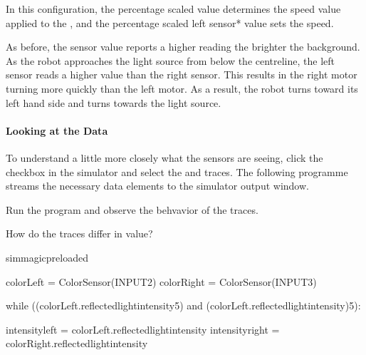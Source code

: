\documentclass[letterpaper,10pt,english]{sphinxmanual}
\begin{document}
{\begin{sphinxVerbatim}[commandchars=\\\{\}]
 
\end{sphinxVerbatim}

In this configuration, the percentage scaled  value determines the speed value applied to the , and the percentage scaled left sensor* value sets the  speed.

As before, the sensor value reports a higher reading the brighter the background. As the robot approaches the light source from below the centreline, the left sensor reads a higher value than the right sensor. This results in the right motor turning more quickly than the left motor. As a result, the robot turns toward its left hand side and turns towards the light source.


\paragraph{Looking at the Data}
\label{\detokenize{content/03_Robot_Lab/Section_00_03:Looking-at-the-Data}}
To understand a little more closely what the sensors are seeing, click the  checkbox in the simulator and select the  and  traces. The following programme streams the necessary data elements to the simulator output window.

Run the program and observe the behvavior of the traces.

How do the traces differ in value?

{
\begin{sphinxVerbatim}[commandchars=\\\{\}]
\llap{\color{nbsphinxin}[ ]:\,\hspace{\fboxrule}\hspace{\fboxsep}}\PYGZpc{}\PYGZpc{}sim\PYGZus{}magic\PYGZus{}preloaded

colorLeft = ColorSensor(INPUT\PYGZus{}2)
colorRight = ColorSensor(INPUT\PYGZus{}3)

while ((colorLeft.reflected\PYGZus{}light\PYGZus{}intensity\PYGZgt{}5)
       and (colorLeft.reflected\PYGZus{}light\PYGZus{}intensity)\PYGZgt{}5):

    intensity\PYGZus{}left = colorLeft.reflected\PYGZus{}light\PYGZus{}intensity
    intensity\PYGZus{}right = colorRight.reflected\PYGZus{}light\PYGZus{}intensity


\end{sphinxVerbatim}}}
\end{document}
